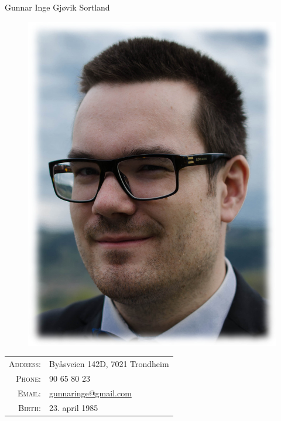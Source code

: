 \documentclass[a4paper,10pt]{article}
\begin{document}
\pagestyle{empty} %

\par{\Huge Gunnar Inge Gjøvik Sortland\bigskip\par}

\begin{figure}
  \vskip -2cm
  \vspace{-20pt}
  \begin{center}
    \includegraphics[height=0.15\textheight,keepaspectratio]{me}
  \end{center}
 \vspace{-20pt}
\end{figure}

\begin{tabular}{rl}
  \textsc{Address:}     & Byåsveien 142D, 7021 Trondheim\\
  \textsc{Phone:}     & 90 65 80 23\\
  \textsc{Email:}       & \href{mailto:gunnaringe@gmail.com}{gunnaringe@gmail.com}\\
  \textsc{Birth:}        & 23. april 1985\\
\end{tabular}
\end{document}
